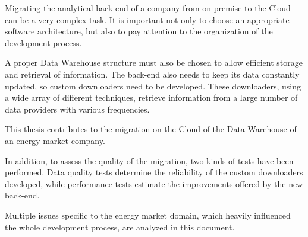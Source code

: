 Migrating the analytical back-end of a company from on-premise to the Cloud can be a very complex task.
It is important not only to choose an appropriate software architecture, but also to pay attention to the organization of the development process.

A proper Data Warehouse structure must also be chosen to allow efficient storage and retrieval of information.
The back-end also needs to keep its data constantly updated, so custom downloaders need to be developed.
These downloaders, using a wide array of different techniques, retrieve information from a large number of data providers with various frequencies.

This thesis contributes to the migration on the Cloud of the Data Warehouse of an energy market company.

In addition, to assess the quality of the migration, two kinds of tests have been performed.
Data quality tests determine the reliability of the custom downloaders developed, while performance tests estimate the improvements offered by the new back-end.

Multiple issues specific to the energy market domain, which heavily influenced the whole development process, are analyzed in this document. 
